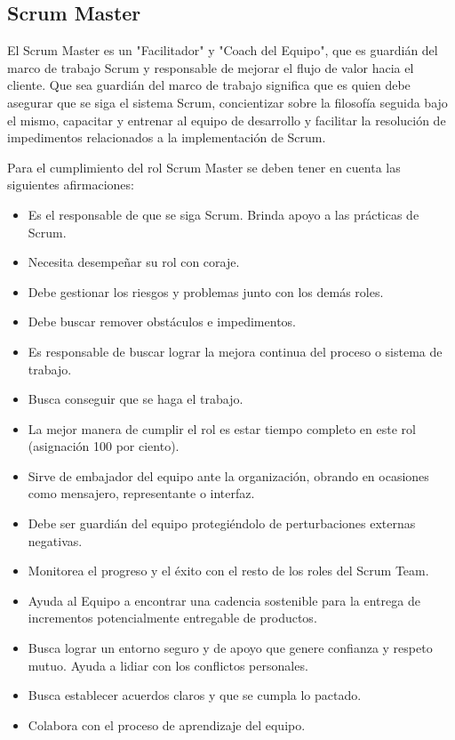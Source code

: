 \subsection{Scrum Master}

El Scrum Master es un "Facilitador" y "Coach del Equipo", que es guardián del marco de trabajo Scrum y responsable de mejorar el flujo de valor hacia el cliente. Que sea guardián del marco de trabajo significa que es quien debe asegurar que se siga el sistema Scrum, concientizar sobre la filosofía seguida bajo el mismo, capacitar y entrenar al equipo de desarrollo y facilitar la resolución de impedimentos relacionados a la implementación de Scrum.

Para el cumplimiento del rol Scrum Master se deben tener en cuenta las siguientes afirmaciones:

\begin{itemize}
\item Es el responsable de que se siga Scrum. Brinda apoyo a las prácticas de Scrum.
\item Necesita desempeñar su rol con coraje.
\item Debe gestionar los riesgos y problemas junto con los demás roles.
\item Debe buscar remover obstáculos e impedimentos.
\item Es responsable de buscar lograr la mejora continua del proceso o sistema de trabajo.
\item Busca conseguir que se haga el trabajo.
\item La mejor manera de cumplir el rol es estar tiempo completo en este rol (asignación 100 por ciento).
\item Sirve de embajador del equipo ante la organización, obrando en ocasiones como mensajero, representante o interfaz.
\item Debe ser guardián del equipo protegiéndolo de perturbaciones externas negativas.
\item Monitorea el progreso y el éxito con el resto de los roles del Scrum Team.
\item Ayuda al Equipo a encontrar una cadencia sostenible para la entrega de incrementos potencialmente entregable de productos. 
\item Busca lograr un entorno seguro y de apoyo que genere confianza y respeto mutuo. Ayuda a lidiar con los conflictos personales.
\item Busca establecer acuerdos claros y que se cumpla lo pactado.
\item Colabora con el proceso de aprendizaje del equipo.

\end{itemize}
